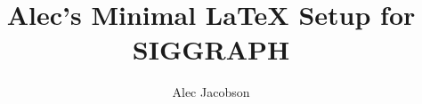 \documentclass[acmtog,nonacm,review]{acmart}
\begin{document}
\title{Alec's Minimal LaTeX Setup for SIGGRAPH}

\author{Alec Jacobson}

\begin{abstract}
\end{abstract}


\maketitle

\layoutdetails



\end{document}
